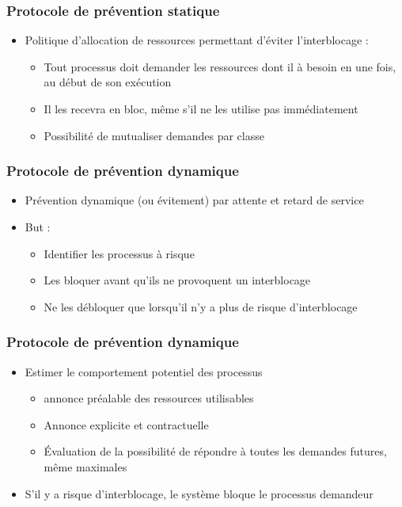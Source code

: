 \begin{frame}
\frametitle{Protocole de prévention statique}
\begin{itemize}
\item Politique d’allocation de ressources permettant d’éviter l’interblocage :
\begin{itemize}
\item Tout processus doit demander les ressources dont il à besoin en une fois, au début de son exécution
\item Il les recevra en bloc, même s’il ne les utilise pas immédiatement
\item Possibilité de mutualiser demandes par classe
\end{itemize}
\end{itemize}
\end{frame}

\begin{frame}
\frametitle{Protocole de prévention dynamique}
\begin{itemize}
\item Prévention dynamique (ou évitement) par attente et retard de service
\item But :
\begin{itemize}
\item Identifier les processus à risque
\item Les bloquer avant qu’ils ne provoquent un interblocage
\item Ne les débloquer que lorsqu’il n’y a plus de risque d’interblocage
\end{itemize}
\end{itemize}
\end{frame}

\begin{frame}
\frametitle{Protocole de prévention dynamique}
\begin{itemize}
\item <1-> Estimer le comportement potentiel des processus
\begin{itemize}
\item annonce préalable des ressources utilisables
\item Annonce explicite et contractuelle
\item Évaluation de la possibilité de répondre à toutes les demandes futures, même maximales
\end{itemize}
\item <2-> S’il y a risque d’interblocage, le système bloque le processus demandeur
\end{itemize}
\end{frame}

